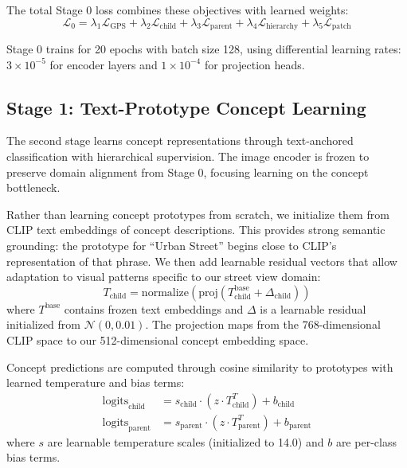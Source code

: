 \documentclass{uva-inf-article}
\begin{document}
The total Stage 0 loss combines these objectives with learned weights:
\begin{equation}
\mathcal{L}_0 = \lambda_1\mathcal{L}_{\text{GPS}} + \lambda_2\mathcal{L}_{\text{child}} + \lambda_3\mathcal{L}_{\text{parent}} + \lambda_4\mathcal{L}_{\text{hierarchy}} + \lambda_5\mathcal{L}_{\text{patch}}
\end{equation}

Stage 0 trains for 20 epochs with batch size 128, using differential learning rates: $3 \times 10^{-5}$ for encoder layers and $1 \times 10^{-4}$ for projection heads.

\subsection{Stage 1: Text-Prototype Concept Learning}

The second stage learns concept representations through text-anchored classification with hierarchical supervision. The image encoder is frozen to preserve domain alignment from Stage 0, focusing learning on the concept bottleneck.

Rather than learning concept prototypes from scratch, we initialize them from CLIP text embeddings of concept descriptions. This provides strong semantic grounding: the prototype for ``Urban Street'' begins close to CLIP's representation of that phrase. We then add learnable residual vectors that allow adaptation to visual patterns specific to our street view domain:
\begin{equation}
T_{\text{child}} = \text{normalize}(\text{proj}(T^{\text{base}}_{\text{child}} + \Delta_{\text{child}}))
\end{equation}
where $T^{\text{base}}$ contains frozen text embeddings and $\Delta$ is a learnable residual initialized from $\mathcal{N}(0, 0.01)$. The projection maps from the 768-dimensional CLIP space to our 512-dimensional concept embedding space.

Concept predictions are computed through cosine similarity to prototypes with learned temperature and bias terms:
\begin{align}
\text{logits}_{\text{child}} &= s_{\text{child}} \cdot (z \cdot T_{\text{child}}^T) + b_{\text{child}} \\
\text{logits}_{\text{parent}} &= s_{\text{parent}} \cdot (z \cdot T_{\text{parent}}^T) + b_{\text{parent}}
\end{align}
where $s$ are learnable temperature scales (initialized to 14.0) and $b$ are per-class bias terms.
\end{document}
